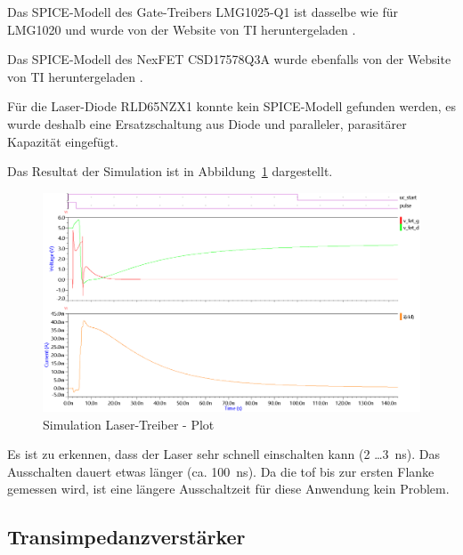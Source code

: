 Das SPICE-Modell des Gate-Treibers LMG1025-Q1 ist dasselbe wie für LMG1020 und wurde von der Website von TI
heruntergeladen \cite{ti2024lmg1025q1}.

Das SPICE-Modell des NexFET CSD17578Q3A wurde ebenfalls von der Website von TI heruntergeladen
\cite{ti2024csd17578q3a}.

Für die Laser-Diode RLD65NZX1 konnte kein SPICE-Modell gefunden werden, es wurde deshalb eine Ersatzschaltung aus Diode
und paralleler, parasitärer Kapazität eingefügt.

Das Resultat der Simulation ist in Abbildung~\ref{fig:simulation_laser_driver_plot} dargestellt.

\begin{figure}[H]
    \centering
    \includegraphics[width=\textwidth]{graphics/simulation_laser_driver_plot.png}
    \caption{Simulation Laser-Treiber - Plot}\label{fig:simulation_laser_driver_plot}
\end{figure}

Es ist zu erkennen, dass der Laser sehr schnell einschalten kann (2 \dots 3~ns). Das Ausschalten dauert etwas länger
(ca. 100~ns). Da die \acrshort{tof} bis zur ersten Flanke gemessen wird, ist eine längere Ausschaltzeit für diese
Anwendung kein Problem.

\subsection{Transimpedanzverstärker}
